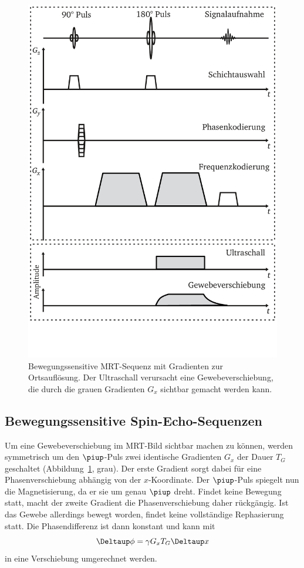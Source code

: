 \documentclass[
    11pt,
    ngerman
]{scrbook}
\begin{document}
\begin{figure}
    \centering
    \includegraphics[width=.7\textwidth]{Abbildungen/sediffmono.pdf}
    \caption{%
        Bewegungssensitive MRT-Sequenz mit Gradienten zur Ortsauflösung. Der Ultraschall verursacht eine Gewebeverschiebung, die durch die grauen Gradienten $G_x$ sichtbar gemacht werden kann.
    }
    \label{fig:bew-sens-sequenz}
\end{figure}

\subsection{Bewegungssensitive Spin-Echo-Sequenzen}

Um eine Gewebeverschiebung im MRT-Bild sichtbar machen zu können, werden
symmetrisch um den $\piup$-Puls zwei identische Gradienten $G_x$ der Dauer
$T_G$ geschaltet (Abbildung~\ref{fig:bew-sens-sequenz}, grau). Der erste
Gradient sorgt dabei für eine Phasenverschiebung abhängig von der
$x$-Koordinate. Der $\piup$-Puls spiegelt nun die Magnetisierung, da er sie um
genau $\piup$ dreht. Findet keine Bewegung statt, macht der zweite Gradient
die Phasenverschiebung daher rückgängig. Ist das Gewebe allerdings bewegt
worden, findet keine vollständige Rephasierung statt. Die Phasendifferenz ist
dann konstant und kann mit
\begin{equation}
    \Deltaup \phi = \gamma G_x T_G \Deltaup x \label{eq:phi_x}
\end{equation}
in eine Verschiebung umgerechnet werden.
\end{document}
